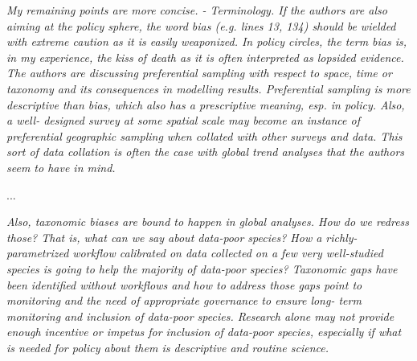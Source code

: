 \documentclass[11pt,letter]{article}
\begin{document}


\begin{mybox}
\emph{My remaining points are more concise.
- Terminology. If the authors are also aiming at the policy sphere, the word bias (e.g. lines
13, 134) should be wielded with extreme caution as it is easily weaponized. In policy
circles, the term bias is, in my experience, the kiss of death as it is often interpreted as
lopsided evidence. The authors are discussing preferential sampling with respect to space,
time or taxonomy and its consequences in modelling results. Preferential sampling is more
descriptive than bias, which also has a prescriptive meaning, esp. in policy. Also, a well-
designed survey at some spatial scale may become an instance of preferential geographic
sampling when collated with other surveys and data. This sort of data collation is often the
case with global trend analyses that the authors seem to have in mind.}  
\end{mybox}

...

\begin{mybox}
\emph{Also, taxonomic biases are bound to happen in global analyses. How do we redress those? That is, what can
we say about data-poor species? How a richly-parametrized workflow calibrated on data
collected on a few very well-studied species is going to help the majority of data-poor
species? Taxonomic gaps have been identified without workflows and how to address
those gaps point to monitoring and the need of appropriate governance to ensure long-
term monitoring and inclusion of data-poor species. Research alone may not provide
enough incentive or impetus for inclusion of data-poor species, especially if what is
needed for policy about them is descriptive and routine science.}  
\end{mybox}
\end{document}
